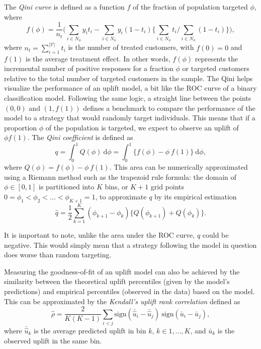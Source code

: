 \documentclass{article}
\begin{document}
The \textit{Qini curve} is defined as a function $f$ of the fraction of population targeted $\phi$, where 
\begin{equation*}
    f(\phi) = \frac{1}{n_t}\biggl(\sum\limits_{i \in  N_{\phi}} y_i t_i - \sum\limits_{i \in  N_{\phi}} y_i (1-t_i) \biggl\{ \sum\limits_{i \in  N_{\phi}} t_i / \sum\limits_{i \in  N_{\phi}} (1-t_i) \biggr\} \biggr),
\end{equation*}
where $n_t = \sum_{i=1}^{|\mathcal{V}|} t_i$ is the number of treated customers, with $f(0)=0$ and $f(1)$ is the average treatment effect. In other words, $f(\phi)$ represents the incremental number of positive responses for a fraction $\phi$ or targeted customers relative to the total number of targeted customers in the sample. The Qini helps visualize the performance of an uplift model, a bit like the ROC curve of a binary classification model. Following the same logic, a straight line between the points $(0,0)$ and $(1, f(1))$ defines a benchmark to compare the performance of the model to a strategy that would randomly target individuals. This means that if a proportion $\phi$ of the population is targeted, we expect to observe an uplift of $\phi f(1)$.
The {\it Qini coefficient} \citep{radcliffe2007using} is defined as
\begin{equation*}
     q = \int_0^1 Q(\phi) ~\mathrm{d}\phi = \int_0^1 \{f(\phi) - \phi~f(1)\} ~\mathrm{d}\phi,
\end{equation*}
where $Q(\phi) = f(\phi) - \phi~f(1)$. This area can be numerically approximated using a Riemann method such as the trapezoid rule formula: the domain of $\phi \in [0,1]$ is partitioned into $K$ bins, or $K+1$ grid points $0=\phi_1 < \phi_2 < ... < \phi_{K+1} = 1$, to approximate $q$ by its empirical estimation
\begin{equation}
  \hat{q} = \dfrac{1}{2} \sum_{k=1}^K (\phi_{k+1}-\phi_k)\{Q(\phi_{k+1}) + Q(\phi_{k})\}.
  \label{eq:q:hat}
\end{equation}

It is important to note, unlike the area under the ROC curve, $\hat{q}$ could be negative. This would simply mean that a strategy following the model in question does worse than random targeting. 

Measuring the goodness-of-fit of an uplift model can also be achieved by the similarity between the theoretical uplift percentiles (given by the model's predictions) and empirical percentiles (observed in the data) based on the model. This can be approximated by the {\it Kendall's uplift rank correlation} \citep{belba2019qbased} defined as
\begin{equation}
    \hat{\rho} = \frac{2}{K(K-1)} \sum_{i<j} \mathrm{sign}(\bar{\hat{u}}_i - \bar{\hat{u}}_j)~\mathrm{sign}(\bar{u}_i - \bar{u}_j),
    \label{eq:corr_coeff}
\end{equation}
where $\bar{\hat{u}}_k$ is the average predicted uplift in bin $k$,  $k \in {1,...,K}$, and $\bar{u}_k$ is the observed uplift in the same bin. 
\end{document}
